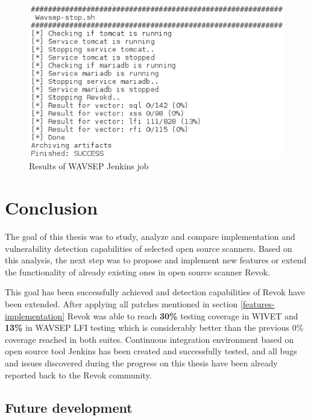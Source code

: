 		\begin{figure}[h!]
		  \centering
		  \includegraphics[width=13cm]{fig/jenkins_wavsep.eps}
		  \caption{Results of WAVSEP Jenkins job}
		  \label{fig:screen-wavsep}
		\end{figure}
			
\chapter{Conclusion}\label{conclusion}

		The goal of this thesis was to study, analyze and compare implementation and vulnerability detection capabilities of selected open source scanners. Based on this analysis, the next step was to propose and implement new features or extend the functionality of already existing ones in open source scanner Revok.
		
		This goal has been successfully achieved and detection capabilities of Revok have been extended. After applying all patches mentioned in section \ref{features-implementation} Revok was able to reach \textbf{30\%} testing coverage in WIVET and \textbf{13\%} in WAVSEP LFI testing which is considerably better than the previous 0\% coverage reached in both suites. Continuous integration environment based on open source tool Jenkins has been created and successfully tested, and all bugs and issues discovered during the progress on this thesis have been already reported back to the Revok community.
	
	\section{Future development}
			
